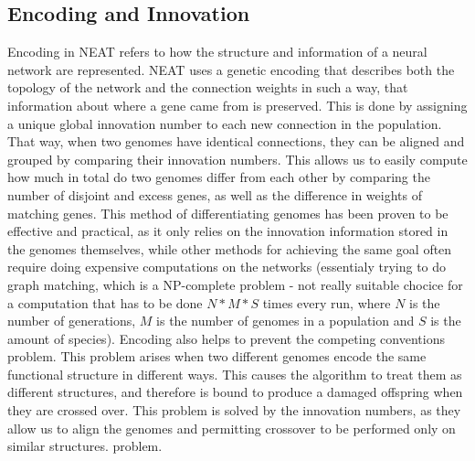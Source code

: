 \documentclass{article}
\begin{document}
\subsection{Encoding and Innovation}

Encoding in NEAT refers to how the structure and information of a neural network are represented.
NEAT uses a genetic encoding that describes both the topology of the network and the connection weights in such a way, that information about
where a gene came from is preserved. This is done by assigning a unique global innovation number to each new connection in the population.
That way, when two genomes have identical connections, they can be aligned and grouped by comparing their innovation numbers. This allows us 
to easily compute how much in total do two genomes differ from each other by comparing the number of disjoint and excess genes, as well as the 
difference in weights of matching genes. This method of differentiating genomes has been proven to be effective and practical, as it only relies
on the innovation information stored in the genomes themselves, while other methods for achieving the same goal often require
doing expensive computations on the networks (essentialy trying to do graph matching, which is a NP-complete problem - not really suitable chocice
for a computation that has to be done $N*M*S$ times every run, where $N$ is the number of generations, $M$ is the number of genomes in a population
and $S$ is the amount of species).
Encoding also helps to prevent the competing conventions problem. This problem arises when two different genomes encode the same
functional structure in different ways. This causes the algorithm to treat them as different structures, and therefore is bound to produce a 
damaged offspring when they are crossed over. This problem is solved by the innovation numbers, as they allow us to align the genomes and
permitting crossover to be performed only on similar structures.
problem. 
\end{document}
